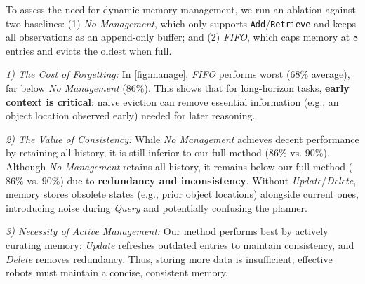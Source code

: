 To assess the need for dynamic memory management, we run an ablation against two baselines: (1) \textit{No Management}, which only supports \texttt{Add}/\texttt{Retrieve} and keeps all observations as an append-only buffer; and (2) \textit{FIFO}, which caps memory at 8 entries and evicts the oldest when full.

\textit{1) The Cost of Forgetting:}
In \autoref{fig:manage}, \textit{FIFO} performs worst ($68\%$ average), far below \textit{No Management} ($86\%$). This shows that for long-horizon tasks, \textbf{early context is critical}: naive eviction can remove essential information (e.g., an object location observed early) needed for later reasoning.

\textit{2) The Value of Consistency:}
While \textit{No Management} achieves decent performance by retaining all history, it is still inferior to our full method ($86\%$ vs. $90\%$).
Although \textit{No Management} retains all history, it remains below our full method ($86\%$ vs. $90\%$) due to \textbf{redundancy and inconsistency}. Without \textit{Update}/\textit{Delete}, memory stores obsolete states (e.g., prior object locations) alongside current ones, introducing noise during \textit{Query} and potentially confusing the planner.

\textit{3) Necessity of Active Management:}
Our method performs best by actively curating memory: \textit{Update} refreshes outdated entries to maintain consistency, and \textit{Delete} removes redundancy. Thus, storing more data is insufficient; effective robots must maintain a concise, consistent memory.



